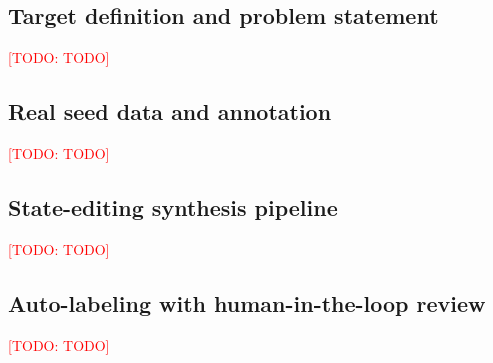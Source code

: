 \documentclass[preprint,12pt]{elsarticle}
\newcommand{\todo}[1]{\textcolor{red}{[TODO: #1]}}
\begin{document}
\subsection{Target definition and problem statement}
\todo{TODO}

\subsection{Real seed data and annotation}
\todo{TODO}

\subsection{State-editing synthesis pipeline}
\todo{TODO}

\subsection{Auto-labeling with human-in-the-loop review}
\todo{TODO}
\end{document}
